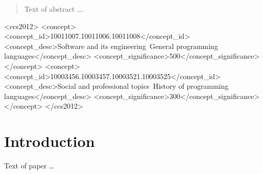 \documentclass[acmsmall,review,anonymous]{acmart}\settopmatter{printfolios=true,printccs=false,printacmref=false}
\begin{document}
\begin{abstract}
Text of abstract \ldots.
\end{abstract}


\begin{CCSXML}
<ccs2012>
<concept>
<concept_id>10011007.10011006.10011008</concept_id>
<concept_desc>Software and its engineering~General programming languages</concept_desc>
<concept_significance>500</concept_significance>
</concept>
<concept>
<concept_id>10003456.10003457.10003521.10003525</concept_id>
<concept_desc>Social and professional topics~History of programming languages</concept_desc>
<concept_significance>300</concept_significance>
</concept>
</ccs2012>
\end{CCSXML}





\maketitle


\section{Introduction}

Text of paper \ldots
\end{document}
